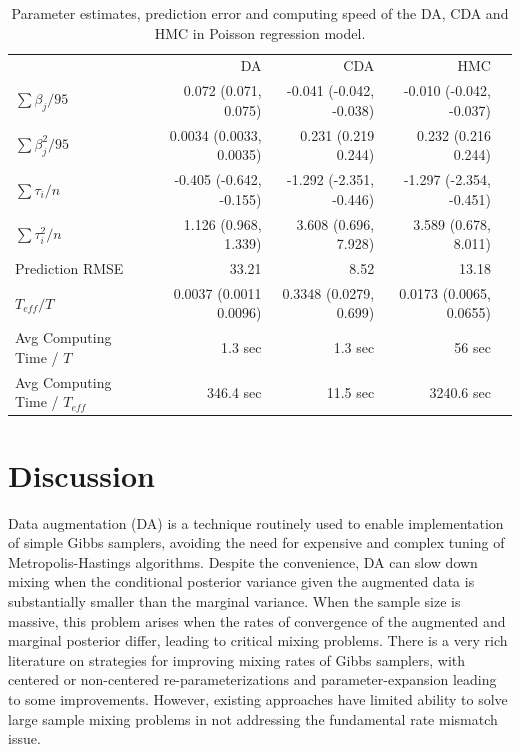 \documentclass[11pt]{article}
\begin{document}
\begin{table}[H]
\small
\centering
\begin{tabular}{|l |r |r| r| r |} 
 \hline
                          & DA & CDA & HMC\\
 [0.5ex]
$\sum \beta_j / 95$         & 0.072 (0.071, 0.075)&  -0.041 (-0.042, -0.038)  & -0.010 (-0.042, -0.037) \\
$\sum \beta_j^2 / 95$         & 0.0034 (0.0033, 0.0035)&  0.231 (0.219 0.244)  & 0.232 (0.216 0.244)   \\
$\sum\tau_i/n$         & -0.405 (-0.642, -0.155)&  -1.292 (-2.351, -0.446)  &  -1.297 (-2.354, -0.451)  \\
$\sum\tau_i^2/n$         & 1.126 (0.968, 1.339)&  3.608 (0.696, 7.928)  & 3.589 (0.678, 8.011)  \\
Prediction RMSE                           & 33.21        & 8.52          & 13.18\\
$T_{eff} / T$ & 0.0037 (0.0011 0.0096) & 0.3348 (0.0279, 0.699) &  0.0173 (0.0065, 0.0655) \\
Avg Computing Time /  $T$  & 1.3 sec       & 1.3 sec        & 56 sec\\
Avg Computing Time /  $T_{eff}$  & 346.4 sec       & 11.5 sec        & 3240.6 sec\\
 \hline
\end{tabular}
\caption{Parameter estimates, prediction error and computing speed of the DA, CDA and HMC in Poisson regression model.}
\label{table:Poisson}
\end{table}

\section{Discussion}
Data augmentation (DA) is a technique routinely used to enable implementation of simple Gibbs samplers, avoiding the need for expensive and complex tuning of Metropolis-Hastings algorithms.
Despite the convenience, DA can slow down mixing when the conditional posterior variance given the augmented data is substantially smaller than the marginal variance.  When the sample size is massive, this problem arises when the rates of convergence of the augmented and marginal posterior differ, leading to 
critical mixing problems.  There is a very rich literature on strategies for improving mixing rates of Gibbs samplers, with centered or non-centered re-parameterizations \citep{papaspiliopoulos2007general} and parameter-expansion \citep{liu1999parameter} leading to some improvements.  However, existing approaches have limited ability to solve large sample mixing problems in not addressing the fundamental rate
mismatch issue.
\end{document}
